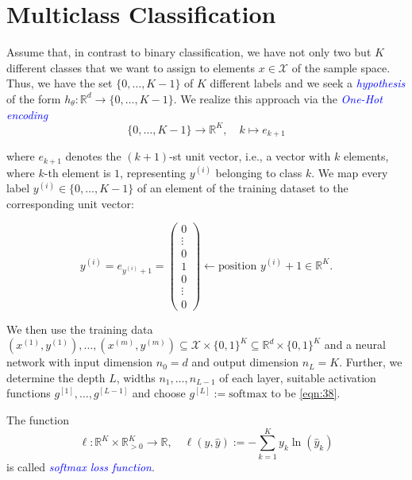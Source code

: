 \section{Multiclass Classification}
Assume that, in contrast to binary classification, we have not only two but $K$ different classes that we want to assign to elements $x \in \mathcal{X}$ of the sample space. Thus, we have the set $\{0, \ldots, K-1\}$ of $K$ different labels and we seek a \textcolor{blue}{\emph{hypothesis}} of the form $h_{\theta}: \mathbb{R}^d \rightarrow \{0, \ldots, K-1\}$. We realize this approach via the \textcolor{blue}{\emph{One-Hot encoding}}
\begin{equation}
    \{0, \ldots, K-1\} \rightarrow \mathbb{R}^K, \quad k \mapsto e_{k+1}
    \label{eqn:39}
\end{equation}

where $e_{k+1}$ denotes the $(k+1)$-st unit vector, i.e., a vector with $k$ elements, where $k$-th element is $1$, representing $y^{(i)}$ belonging to class $k$. We map every label $y^{(i)} \in \{0, \ldots, K-1\}$ of an element of the training dataset to the corresponding unit vector:

\begin{equation}
    y^{(i)} = e_{y^{(i)}+1} = \begin{pmatrix} 0 \\ \vdots \\ 0 \\ 1 \\ 0 \\ \vdots \\ 0 \end{pmatrix} \leftarrow \text{position } y^{(i)}+1 \in \mathbb{R}^K.
    \label{eqn:40}
\end{equation}

We then use the training data ${(x^{(1)}, y^{(1)}), \ldots, (x^{(m)}, y^{(m)})} \subseteq \mathcal{X} \times \{0, 1\}^K \subseteq \mathbb{R}^d \times \{0, 1\}^K$ and a neural network with input dimension $n_0 =d$ and output dimension $n_L = K$. Further, we determine the depth $L$, widths $n_1, \ldots, n_{L-1}$ of each layer, suitable activation functions $g^{[1]}, \ldots, g^{[L-1]}$ and choose $g^{[L]}:= \text{softmax}$ to be \ref{eqn:38}.

\begin{definition}
The function
\begin{equation}
    \ell : \mathbb{R}^K \times \mathbb{R}^K_{>0} \rightarrow \mathbb{R}, \quad \ell(y, \hat{y}):= -\sum_{k=1}^{K}y_k \ln(\hat{y}_k)
    \label{eqn:41}
\end{equation}
is called \textcolor{blue}{\emph{softmax loss function}}.
\end{definition}

